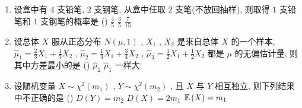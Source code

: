 \begin{enumerate}
	\item 设盒中有 $4$ 支铅笔, $2$ 支钢笔, 从盒中任取 $2$ 支笔(不放回抽样), 则取得 $1$ 支铅笔和 $1$ 支钢笔的概率是 (\hspace{1pc})
	{$\frac{4}{5}$}
	{$\frac{3}{5}$}
	{$\frac{7}{15}$}

	\item 设总体 $X$ 服从正态分布 $N(\mu,1)$ , $X_1$ , $X_2$ 是来自总体 $X$ 的一个样本, $\hat\mu_1=\frac{2}{3}X_1+\frac{1}{3}X_2$ , 
	$\hat\mu_2=\frac{1}{4}X_1+\frac{3}{4}X_2$ , $\hat\mu_3=\frac{1}{2}X_1+\frac{1}{2}X_2$ 都是 $\mu$ 的无偏估计量, 则其中方差最小的是 (\hspace{1pc})
	{$\hat\mu_2$}
	{$\hat\mu_1$}
	{一样大}

	\item 设随机变量 $X\sim\chi^2(m_1)$ , $Y\sim\chi^2(m_2)$ , 且 $X$ 与 $Y$ 相互独立, 则下列结果中不正确的是 (\hspace{1pc})
	{$D(Y)=m_2$}
	{$D(X)=2m_1$}
	{$\mathbb{E}\,(X)=m_1$}
 \end{enumerate}

